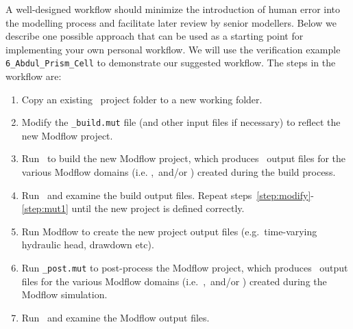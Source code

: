 \label{Appendix:SuggestedWorkflow}A well-designed workflow should minimize the introduction of human error into the modelling process and facilitate later review by senior modellers.   Below we describe one possible approach that can be used as a starting point for implementing your own personal workflow.  We will use the verification example \verb+6_Abdul_Prism_Cell+ to demonstrate our suggested workflow. The steps in the workflow are:
\begin{enumerate}
    \item Copy an existing \mut\ project folder to a new working folder. \label{step:copy}
    \item Modify the \verb+_build.mut+ file (and other input files if necessary) to reflect the new Modflow project.\label{step:modify}
    \item Run \mut\ to build the new Modflow project, which produces \tecplot\ output files for the various Modflow domains (i.e. \gwf,\swf\ and/or \cln ) created during the build process. \label{step:mut1}
    \item Run \tecplot\ and examine the build output files.   Repeat steps~\ref{step:modify}-\ref{step:mut1} until the new project is defined correctly.\label{step:Tecplot1}
    \item Run Modflow to create the new project output files (e.g.\ time-varying hydraulic head, drawdown etc).\label{step:modflow}
    \item Run \verb+_post.mut+ to post-process the Modflow project, which produces \tecplot\ output files for the various Modflow domains (i.e.\ \gwf,\swf\ and/or \cln ) created during the Modflow simulation.\label{step:mut2}
    \item Run \tecplot\ and examine the Modflow output files.   \label{step:Tecplot2}
\end{enumerate}

